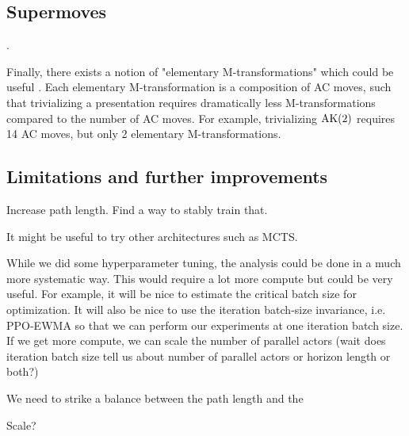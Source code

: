\subsection{Supermoves}.

Finally, there exists a notion of "elementary M-transformations" which could be useful \cite{BurnsI, BurnsII}.
Each elementary M-transformation is a composition of AC moves, such that trivializing a presentation requires dramatically less M-transformations compared to the number of AC moves.
For example, trivializing $\text{AK}(2)$ requires 14 AC moves, but only 2 elementary M-transformations.


\subsection{Limitations and further improvements}

Increase path length. Find a way to stably train that. 

It might be useful to try other architectures such as MCTS.

While we did some hyperparameter tuning, the analysis could be done in a much more systematic way. This would require a lot more compute but could be very useful. For example, it will be nice to estimate the critical batch size for optimization. It will also be nice to use the iteration batch-size invariance, i.e. PPO-EWMA so that we can perform our experiments at one iteration batch size. If we get more compute, we can scale the number of parallel actors (wait does iteration batch size tell us about number of parallel actors or horizon length or both?)

We need to strike a balance between the path length and the 

Scale?